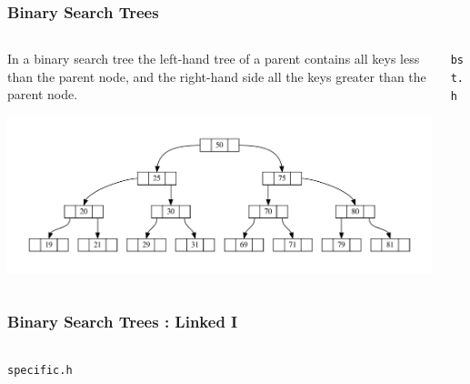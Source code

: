 
\begin{frame}[fragile]
\frametitle{Binary Search Trees}
\begin{columns}[T]

\begin{column}{0.40\textwidth}
In a binary search tree the left-hand tree of a parent contains
all keys less than the parent node, and the right-hand side all
the keys greater than the parent node.	
\begin{center}	
\includegraphics[width=\textwidth]{../Images/Linkedb.pdf}	
\end{center}	
\end{column}

\pause
\begin{column}{0.50\textwidth}
\verb^bst.h^

\end{column}

\end{columns}
\end{frame}


\begin{frame}[fragile]
\frametitle{Binary Search Trees : Linked I}
\begin{columns}[T]

\begin{column}{0.45\textwidth}
\verb^specific.h^

\end{column}

\pause
\begin{column}{0.45\textwidth}

\end{column}

\end{columns}
\end{frame}

